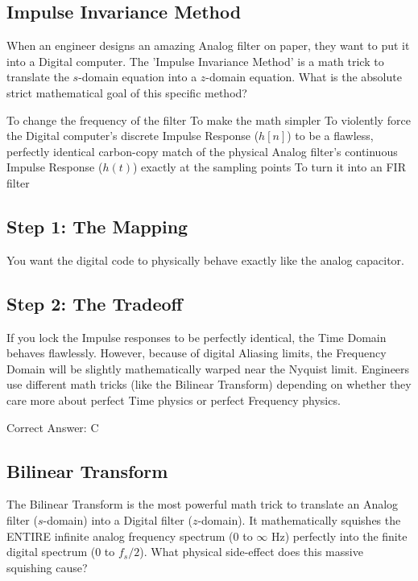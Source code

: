 \clearpage

\subsection{Impulse Invariance Method}

When an engineer designs an amazing Analog filter on paper, they want to put it into a Digital computer. The 'Impulse Invariance Method' is a math trick to translate the $s$-domain equation into a $z$-domain equation. What is the absolute strict mathematical goal of this specific method?

\begin{choices}
    \choice To change the frequency of the filter
    \choice To make the math simpler
    \correctchoice To violently force the Digital computer's discrete Impulse Response ($h[n]$) to be a flawless, perfectly identical carbon-copy match of the physical Analog filter's continuous Impulse Response ($h(t)$) exactly at the sampling points
    \choice To turn it into an FIR filter
\end{choices}

\begin{solution}

\subsection*{Step 1: The Mapping}
You want the digital code to physically behave exactly like the analog capacitor.

\subsection*{Step 2: The Tradeoff}
If you lock the Impulse responses to be perfectly identical, the Time Domain behaves flawlessly. However, because of digital Aliasing limits, the Frequency Domain will be slightly mathematically warped near the Nyquist limit. Engineers use different math tricks (like the Bilinear Transform) depending on whether they care more about perfect Time physics or perfect Frequency physics.

Correct Answer: C
\end{solution}

\clearpage

\subsection{Bilinear Transform}

The Bilinear Transform is the most powerful math trick to translate an Analog filter ($s$-domain) into a Digital filter ($z$-domain). It mathematically squishes the ENTIRE infinite analog frequency spectrum ($0$ to $\infty\text{ Hz}$) perfectly into the finite digital spectrum ($0$ to $f_s/2$). What physical side-effect does this massive squishing cause?

